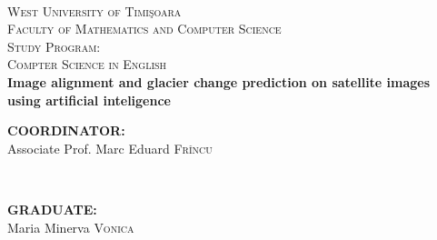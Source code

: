 \documentclass[12pt, a4paper]{report}
\begin{document}
	\begin{titlepage}
		
		\newcommand{\HRule}{\rule{\linewidth}{0.5mm}} %
		
		\center %
		
		
		\textsc{}\\[.7cm]
		
		
		\textsc{\LARGE West University of  Timi\c{s}oara}\\[0.5cm] %
		\textsc{\Large Faculty of Mathematics and Computer Science}\\[0.5cm] %
		\textsc{\large Study Program: \\Compter Science in English}\\[4.5cm] %
		
		
		
		
		{\Huge \bfseries Image alignment and glacier change prediction on satellite images using artificial inteligence}\\[6cm] %
		
		
		
		\begin{minipage}{0.4\textwidth}
			\begin{flushleft} \large
				\textbf{COORDINATOR:}\\
				Associate Prof. Marc Eduard \textsc{Frîncu} %
			\end{flushleft}
		\end{minipage}
		~
		\begin{minipage}{0.4\textwidth}
			\begin{flushright} \large
				\textbf{GRADUATE:} \\
				Maria Minerva \textsc{Vonica} %
			\end{flushright}
		\end{minipage}\\[0.5cm]
		

\end{titlepage}
\end{document}
